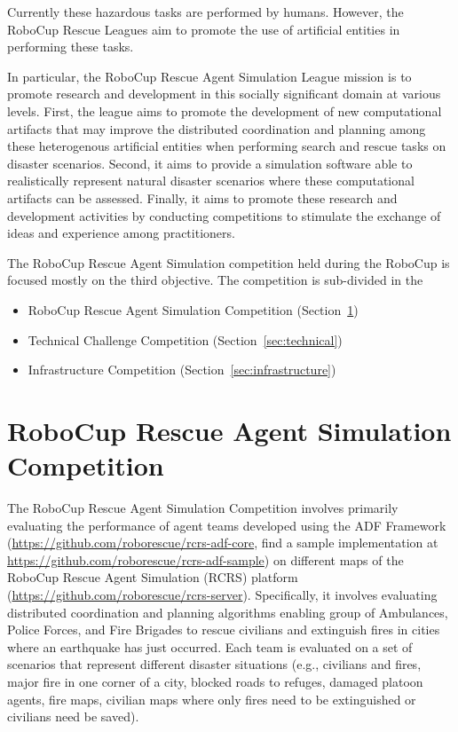 \documentclass{article}
\begin{document}
Currently these hazardous tasks are performed by humans. However, the RoboCup Rescue Leagues aim to promote the use of artificial entities in performing these tasks.

In particular, the RoboCup Rescue Agent Simulation League mission is to promote research and development in this socially significant domain at various levels. First, the league aims to promote the development of new computational artifacts that may improve the distributed coordination and planning among these heterogenous artificial entities when performing search and rescue tasks on disaster scenarios. Second, it aims to provide a simulation software able to realistically represent natural disaster scenarios where these computational artifacts can be assessed. Finally, it aims to promote these research and development activities by conducting competitions to stimulate the exchange of ideas and experience among practitioners.

The RoboCup Rescue Agent Simulation competition held during the RoboCup is
focused mostly on the third objective. The competition is sub-divided in the
\begin{itemize}
\item RoboCup Rescue Agent Simulation Competition (Section~\ref{sec:agent})
\item Technical Challenge Competition (Section~\ref{sec:technical})
\item Infrastructure Competition (Section~\ref{sec:infrastructure})
\end{itemize}
\section{RoboCup Rescue Agent Simulation Competition}
\label{sec:agent}
The RoboCup Rescue Agent Simulation Competition involves primarily evaluating the performance of agent teams developed using the ADF Framework (\url{https://github.com/roborescue/rcrs-adf-core}, find a sample implementation at \url{https://github.com/roborescue/rcrs-adf-sample}) on different maps of the RoboCup Rescue Agent Simulation (RCRS) platform (\url{https://github.com/roborescue/rcrs-server}). Specifically, it involves evaluating distributed coordination and planning algorithms enabling group of Ambulances, Police Forces, and Fire Brigades to rescue civilians and extinguish fires in cities where an earthquake has just occurred. Each team is evaluated on a set of scenarios that represent different disaster situations (e.g., civilians and fires, major fire in one corner of a city, blocked roads to refuges, damaged platoon agents, fire maps, civilian maps where only fires need to be extinguished or civilians need be saved).
\end{document}
